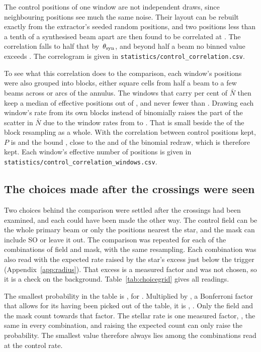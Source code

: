 The control positions of one window are not independent draws, since
neighbouring positions see much the same noise. Their layout can be rebuilt
exactly from the extractor's seeded random positions, and two positions
less than a tenth of a synthesised beam apart are then found to be
correlated at \CcRhoNear. The correlation falls to half that by
\CcHalfBeam\,$\theta_{\rm syn}$, and beyond half a beam no binned value
exceeds \CcRhoHalfBeamOut. The correlogram is given in
\texttt{statistics/\allowbreak control\_correlation.csv}.

To see what this correlation does to the comparison, each window's positions
were also grouped into blocks, either square cells from half a beam to a few
beams across or arcs of the annulus. The \CcNLead{} windows that carry
\CcLeadPct{} per cent of $\bar N$ then keep a median of \CcNeffLeadMed{}
effective positions out of \NCtrl, and never fewer than \CcNeffLeadMin.
Drawing each window's rate from its own blocks instead of binomially raises
the part of the scatter in $\bar N$ due to the window rates from
\CcSdBinom{} to \CcSdCorr. That is small beside the \CcSdTotal{} of the block
resampling as a whole. With the correlation between control positions kept,
$P$ is \CcProbRange{} and the bound \CcAddLimRange, close to the \CeProbNull{}
and \CeAddLim{} of the binomial redraw, which is therefore kept.
Each window's effective number of positions is given in
\texttt{statistics/\allowbreak control\_correlation\_windows.csv}.

\subsection{The choices made after the crossings were seen}
\label{sec:choicegrid}

Two choices behind the comparison were settled after the crossings had been
examined, and each could have been made the other way. The control field
can be the whole primary beam or only the positions nearest the star, and
the mask can include SO or leave it out. The comparison was repeated for
each of the \CgNTrialWord{} combinations of field and mask, with the same
resampling. Each combination was also read with the expected rate raised by
the star's excess just below the trigger (Appendix~\ref{app:radius}). That
excess is a measured factor and was not chosen, so it is a check on the
background. Table~\ref{tab:choicegrid}
gives all \CgNCellWord{} readings.

The smallest probability in the table is \CgMinProb, for \CgMinCell.
Multiplied by \CgNTrialWord, a Bonferroni factor that allows for its having
been picked out of the table, it is \CgBonfPhrase, \CgVerdictClause.
Only the field and the mask count towards that factor. The stellar rate
is one measured factor, \CeNear, the same in every combination, and raising
the expected count can only raise the probability. The smallest value therefore always lies among the
\CgNTrialWord{} combinations read at the control rate.

